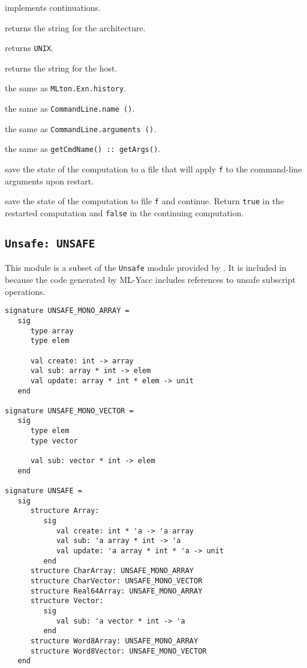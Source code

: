 \begin{description}

 implements continuations.

returns the string for the architecture.

returns {\tt UNIX}.

returns the string for the host.

the same as {\tt MLton.Exn.history}.

the same as {\tt CommandLine.name ()}.

the same as {\tt CommandLine.arguments ()}.

the same as {\tt getCmdName() :: getArgs()}.

save the state of the computation to a file that will apply {\tt f} to
the command-line arguments upon restart.

save the state of the computation to file {\tt f} and continue.
Return {\tt true} in the restarted computation and {\tt false} in the
continuing computation.

\end{description}
%
\subsection{{\tt Unsafe: UNSAFE}}

This module is a subset of the {\tt Unsafe} module provided by
{\smlnj}.  It is included in {\mlton} because the code generated by
ML-Yacc includes references to unsafe subscript operations.

\begin{verbatim}
signature UNSAFE_MONO_ARRAY =
   sig
      type array
      type elem

      val create: int -> array
      val sub: array * int -> elem
      val update: array * int * elem -> unit
   end

signature UNSAFE_MONO_VECTOR =
   sig
      type elem
      type vector

      val sub: vector * int -> elem
   end

signature UNSAFE =
   sig
      structure Array:
         sig
            val create: int * 'a -> 'a array
            val sub: 'a array * int -> 'a
            val update: 'a array * int * 'a -> unit
         end
      structure CharArray: UNSAFE_MONO_ARRAY
      structure CharVector: UNSAFE_MONO_VECTOR
      structure Real64Array: UNSAFE_MONO_ARRAY
      structure Vector:
         sig
            val sub: 'a vector * int -> 'a
         end
      structure Word8Array: UNSAFE_MONO_ARRAY
      structure Word8Vector: UNSAFE_MONO_VECTOR
   end
\end{verbatim}
